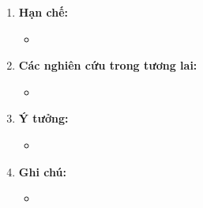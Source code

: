 \documentclass[11pt]{article}
\begin{document}
\begin{enumerate}[\arabic*]
\begin{itemize}
\begin{table}[h]
\begin{center}
\begin{tabular}{|c|c|c|c|c|}
            \end{tabular}
            \end{center}
        \end{table}
    \end{itemize}
    
    \item
    \textbf{Hạn chế:}
    \begin{itemize}
        \item \blindtext[0]
    \end{itemize}
    
    \item
    \textbf{Các nghiên cứu trong tương lai:}
    \begin{itemize}
        \item \blindtext[0]
    \end{itemize}
    
    \item
    \textbf{Ý tưởng:}
    \begin{itemize}
        \item \blindtext[0]
    \end{itemize}
    
    \item
    \textbf{Ghi chú:}
    \begin{itemize}
        \item \blindtext[0]
    \end{itemize}

         
\end{enumerate}
\end{document}
